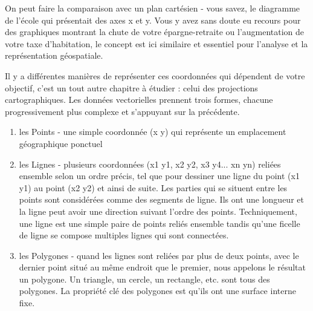 On peut faire la comparaison avec un plan cartésien - vous savez, le diagramme de l'école qui présentait des axes x et y. Vous y avez sans doute eu recours pour des graphiques montrant la chute de votre épargne-retraite ou l'augmentation de votre taxe d'habitation, le concept est ici similaire et essentiel pour l'analyse et la représentation géospatiale.

Il y a différentes manières de représenter ces coordonnées qui dépendent de votre objectif, c'est un tout autre chapitre à étudier : celui des projections cartographiques.
Les données vectorielles prennent trois formes, chacune progressivement plus complexe et s'appuyant sur la précédente.  

\begin{enumerate} 
\item les Points - une simple coordonnée (x y) qui représente un emplacement géographique ponctuel 
\item les Lignes - plusieurs coordonnées (x1 y1, x2 y2, x3 y4... xn yn) reliées ensemble selon un ordre précis, tel que pour dessiner une ligne du point (x1 y1) au point (x2 y2) et ainsi de suite. Les parties qui se situent entre les points sont considérées comme des segments de ligne. Ils ont une longueur et la ligne peut avoir une direction suivant l'ordre des points. Techniquement, une ligne est une simple paire de points reliés ensemble tandis qu'une ficelle de ligne se compose multiples lignes qui sont connectées.
\item les Polygones - quand les lignes sont reliées par plus de deux points, avec le dernier point situé au même endroit que le premier, nous appelons le résultat un polygone. Un triangle, un cercle, un rectangle, etc. sont tous des polygones. La propriété clé des polygones est qu'ils ont une surface interne fixe.
\end{enumerate}
